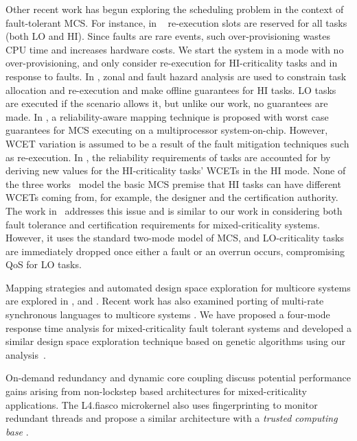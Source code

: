 \documentclass[conference]{IEEEtran}
\begin{document}
Other recent work has begun exploring the scheduling problem in the context of fault-tolerant MCS. For instance, in ~\cite{lin2014scheduling} re-execution slots are reserved for all tasks (both LO and HI). Since faults are rare events, such over-provisioning wastes CPU time and increases hardware costs. We start the system in a mode with no over-provisioning, and only consider re-execution for HI-criticality tasks and in response to faults. In \cite{thekkilakattil2014mixed}, zonal and fault hazard analysis are used to constrain task allocation and re-execution and make offline guarantees for HI tasks. LO tasks are executed if the scenario allows it, but unlike our work, no guarantees are made. In \cite{kang2014static}, a reliability-aware mapping technique is proposed with worst case guarantees for MCS executing on a multiprocessor system-on-chip. However, WCET variation is assumed to be a result of the fault mitigation techniques such as re-execution. In \cite{huang2014scheduling}, the reliability requirements of tasks are accounted for by deriving new values for the HI-criticality tasks' WCETs in the HI mode. None of the three works~\cite{thekkilakattil2014mixed, kang2014static, huang2014scheduling} model the basic MCS premise that HI tasks can have different WCETs coming from, for example, the designer and the certification authority.
The work in~\cite{pathan14} addresses this issue and is similar to our work in considering both fault tolerance and certification requirements for mixed-criticality systems. However, it uses the standard two-mode model of MCS, and LO-criticality tasks are immediately dropped once either a fault or an overrun occurs, compromising QoS for LO tasks.

Mapping strategies and automated design space exploration for multicore systems are explored in \cite{bolchini2013reliability}, and \cite{kang2014static}. Recent work has also examined porting of multi-rate synchronous languages to multicore systems \cite{puffitsch2013mapping}. We have proposed a four-mode response time analysis for mixed-criticality fault tolerant systems and developed a similar design space exploration technique based on genetic algorithms using our analysis~\cite{albayati2016modes}.

On-demand redundancy \cite{Meyer:CASES11,fu2013demand} and dynamic core coupling \cite{lafrieda2007utilizing} discuss potential performance gains arising from non-lockstep based architectures for mixed-criticality applications.  
 	The L4.fiasco microkernel also uses fingerprinting to monitor redundant threads \cite{dobel2012operating} and propose a similar architecture with a \emph{trusted computing base} \cite{dobel2012watches}. 
\end{document}
